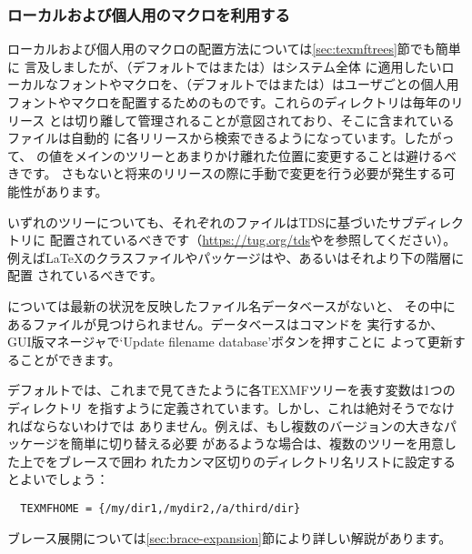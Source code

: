 \documentclass[uplatex,dvipdfmx,12pt,tombow]{jsarticle}
\begin{document}
\subsubsection{ローカルおよび個人用のマクロを利用する}
\label{sec:local-personal-macros}

ローカルおよび個人用のマクロの配置方法については\ref{sec:texmftrees}節でも簡単に
言及しましたが、（デフォルトではまたは）はシステム全体
に適用したいローカルなフォントやマクロを、（デフォルトではまたは）はユーザごとの個人用
フォントやマクロを配置するためのものです。これらのディレクトリは毎年のリリース
とは切り離して管理されることが意図されており、そこに含まれているファイルは自動的
に各\TL リリースから検索できるようになっています。したがって、%
の値をメインの\TL ツリーとあまりかけ離れた位置に変更することは避けるべきです。
さもないと将来のリリースの際に手動で変更を行う必要が発生する可能性があります。

いずれのツリーについても、それぞれのファイルはTDSに基づいたサブディレクトリに
配置されているべきです（\url{https://tug.org/tds}やを参照してください）。例えば\LaTeX のクラスファイルやパッケージはや、あるいはそれより下の階層に配置
されているべきです。

については最新の状況を反映したファイル名データベースがないと、
その中にあるファイルが見つけられません。データベースはコマンドを
実行するか、GUI版\TL マネージャで`Update filename database'ボタンを押すことに
よって更新することができます。

デフォルトでは、これまで見てきたように各TEXMFツリーを表す変数は1つのディレクトリ
を指すように定義されています。しかし、これは絶対そうでなければならないわけでは
ありません。例えば、もし複数のバージョンの大きなパッケージを簡単に切り替える必要
があるような場合は、複数のツリーを用意した上でをブレースで囲わ
れたカンマ区切りのディレクトリ名リストに設定するとよいでしょう：
%
\begin{verbatim}
  TEXMFHOME = {/my/dir1,/mydir2,/a/third/dir}
\end{verbatim}
%
ブレース展開については\ref{sec:brace-expansion}節により詳しい解説があります。
\end{document}
